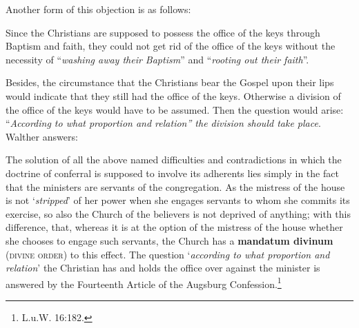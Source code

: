                 Another form of this objection is as follows: \begin{displayquote}{\footnotesize Since the Christians are supposed to possess the office of the keys through Baptism and faith, they could not get rid of the office of the keys without the necessity of “\textit{washing away their Baptism}” and “\textit{rooting out their faith}”.}\end{displayquote}  Besides, the circumstance that the Christians bear the Gospel upon their lips would indicate that they still had the office of the keys.  Otherwise a division of the office of the keys would have to be assumed.  Then the question would arise: “\textit{According to what proportion and relation” the division should take place}.  Walther answers: \begin{fancyquotes}The solution of all the above named difficulties and contradictions in which the doctrine of conferral is supposed to involve its adherents lies simply in the fact that the ministers are servants of the congregation.  As the mistress of the house is not ‘\textit{stripped}’ of her power when she engages servants to whom she commits its exercise, so also the Church of the believers is not deprived of anything; with this difference, that, whereas it is at the option of the mistress of the house whether she chooses to engage such servants, the Church has a \textbf{mandatum divinum} {\scriptsize\textsc{(divine order)}} to this effect.  The question ‘\textit{according to what proportion and relation}’ the Christian has and holds the office over against the minister is answered by the Fourteenth Article of the Augsburg Confession.\footnote{L.u.W. 16:182.}\end{fancyquotes}

